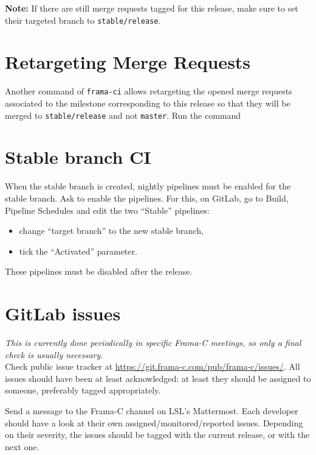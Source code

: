 \textbf{Note:} If there are still merge requests tagged for this release, make
sure to set their targeted branch to \texttt{stable/release}.

\section{Retargeting Merge Requests}
\label{sec:retarg-merge-requ}

Another command of \texttt{frama-ci} allows retargeting
the opened merge requests associated to the milestone corresponding
to this release so that they will be merged to \texttt{stable/release}
and not \texttt{master}. Run the command

\section{Stable branch CI}
\label{sec:stable-branch-ci}

When the stable branch is created, nightly pipelines must be enabled for the
stable branch. Ask \expertise{Allan} to enable the pipelines. For this, on
GitLab, go to Build, Pipeline Schedules and edit the two ``Stable'' pipelines:
\begin{itemize}
  \item change ``target branch'' to the new stable branch,
  \item tick the ``Activated'' parameter.
\end{itemize}

These pipelines must be disabled after the release.

\section{GitLab issues}
\label{sec:gitlab-issues}

{\em This is currently done periodically in specific Frama-C meetings, so only
  a final check is usually necessary.}~\\

Check public issue tracker at \url{https://git.frama-c.com/pub/frama-c/issues/}.
All issues should have been at least acknowledged: at least they should be
assigned to someone, preferably tagged appropriately.

Send a message to the Frama-C channel on LSL's Mattermost. Each developer should
have a look at their own assigned/monitored/reported issues. Depending on their
severity, the issues should be tagged with the current release, or with the next
one.

